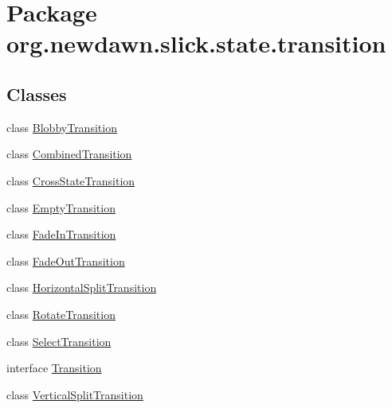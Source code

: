 \hypertarget{namespaceorg_1_1newdawn_1_1slick_1_1state_1_1transition}{}\section{Package org.\+newdawn.\+slick.\+state.\+transition}
\label{namespaceorg_1_1newdawn_1_1slick_1_1state_1_1transition}
\subsection*{Classes}
\begin{DoxyCompactItemize}
\item 
class \mbox{\hyperlink{classorg_1_1newdawn_1_1slick_1_1state_1_1transition_1_1_blobby_transition}{Blobby\+Transition}}
\item 
class \mbox{\hyperlink{classorg_1_1newdawn_1_1slick_1_1state_1_1transition_1_1_combined_transition}{Combined\+Transition}}
\item 
class \mbox{\hyperlink{classorg_1_1newdawn_1_1slick_1_1state_1_1transition_1_1_cross_state_transition}{Cross\+State\+Transition}}
\item 
class \mbox{\hyperlink{classorg_1_1newdawn_1_1slick_1_1state_1_1transition_1_1_empty_transition}{Empty\+Transition}}
\item 
class \mbox{\hyperlink{classorg_1_1newdawn_1_1slick_1_1state_1_1transition_1_1_fade_in_transition}{Fade\+In\+Transition}}
\item 
class \mbox{\hyperlink{classorg_1_1newdawn_1_1slick_1_1state_1_1transition_1_1_fade_out_transition}{Fade\+Out\+Transition}}
\item 
class \mbox{\hyperlink{classorg_1_1newdawn_1_1slick_1_1state_1_1transition_1_1_horizontal_split_transition}{Horizontal\+Split\+Transition}}
\item 
class \mbox{\hyperlink{classorg_1_1newdawn_1_1slick_1_1state_1_1transition_1_1_rotate_transition}{Rotate\+Transition}}
\item 
class \mbox{\hyperlink{classorg_1_1newdawn_1_1slick_1_1state_1_1transition_1_1_select_transition}{Select\+Transition}}
\item 
interface \mbox{\hyperlink{interfaceorg_1_1newdawn_1_1slick_1_1state_1_1transition_1_1_transition}{Transition}}
\item 
class \mbox{\hyperlink{classorg_1_1newdawn_1_1slick_1_1state_1_1transition_1_1_vertical_split_transition}{Vertical\+Split\+Transition}}
\end{DoxyCompactItemize}
